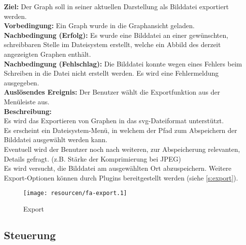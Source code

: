 \label{fa:export_img}
\textbf{Ziel:} Der Graph soll in seiner aktuellen Darstellung als Bilddatei exportiert werden.\\
\textbf{Vorbedingung:} Ein Graph wurde in die Graphansicht geladen. \\
\textbf{Nachbedingung (Erfolg):} Es wurde eine Bilddatei an einer gewünschten, schreibbaren Stelle im Dateisystem erstellt, welche ein Abbild des derzeit angezeigten Graphen enthält.\\
\textbf{Nachbedingung (Fehlschlag):} Die Bilddatei konnte wegen eines Fehlers beim Schreiben in die Datei nicht erstellt werden. Es wird eine Fehlermeldung ausgegeben.\\
\textbf{Auslösendes Ereignis:}
Der Benutzer wählt die Exportfunktion aus der Menüleiste aus.\\
\textbf{Beschreibung:}\\
Es wird das Exportieren von Graphen in das \gls{svg}-Dateiformat unterstützt.\\
Es erscheint ein Dateisystem-Menü, in welchem der Pfad zum Abspeichern der Bilddatei ausgewählt werden kann.\\
Eventuell wird der Benutzer noch nach weiteren, zur Abspeicherung relevanten, Details gefragt. (z.B. Stärke der Komprimierung bei JPEG)\\ %
Es wird versucht, die Bilddatei am ausgewählten Ort abzuspeichern.
Weitere Export-Optionen können durch Plugins bereitgestellt werden (siehe \ref{s:export}).

\begin{figure}[ht]
  \centering
  \texttt{[image: resourcen/fa-export.1]}
  \caption{Export}
  \label{fig:export}
\end{figure}

\subsection{Steuerung}
\setcounter{fanr}{200}


